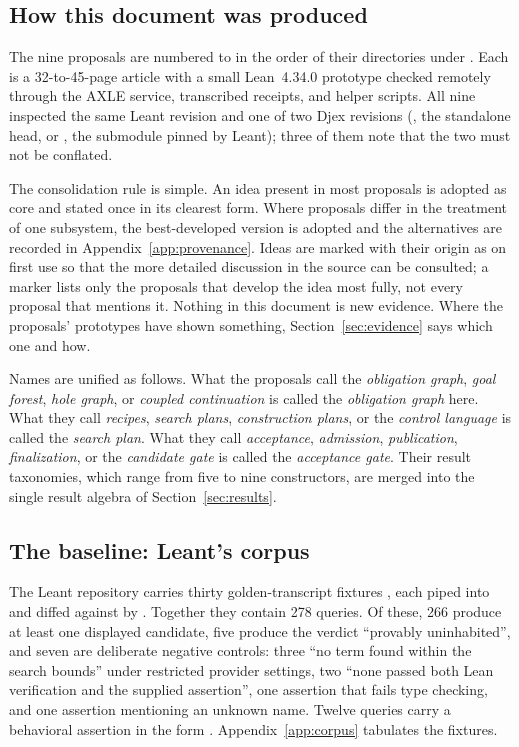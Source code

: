 \subsection{How this document was produced}\label{sec:method}

The nine proposals are numbered  to  in the order of their directories under . Each is a 32-to-45-page article with a small Lean~4.34.0 prototype checked remotely through the AXLE service, transcribed receipts, and helper scripts. All nine inspected the same Leant revision  and one of two Djex revisions (, the standalone head, or , the submodule pinned by Leant); three of them note that the two must not be conflated.

The consolidation rule is simple. An idea present in most proposals is adopted as core and stated once in its clearest form. Where proposals differ in the treatment of one subsystem, the best-developed version is adopted and the alternatives are recorded in Appendix~\ref{app:provenance}. Ideas are marked with their origin as  on first use so that the more detailed discussion in the source can be consulted; a marker lists only the proposals that develop the idea most fully, not every proposal that mentions it. Nothing in this document is new evidence. Where the proposals' prototypes have shown something, Section~\ref{sec:evidence} says which one and how.

Names are unified as follows. What the proposals call the \emph{obligation graph}, \emph{goal forest}, \emph{hole graph}, or \emph{coupled continuation} is called the \emph{obligation graph} here. What they call \emph{recipes}, \emph{search plans}, \emph{construction plans}, or the \emph{control language} is called the \emph{search plan}. What they call \emph{acceptance}, \emph{admission}, \emph{publication}, \emph{finalization}, or the \emph{candidate gate} is called the \emph{acceptance gate}. Their result taxonomies, which range from five to nine constructors, are merged into the single result algebra of Section~\ref{sec:results}.

\subsection{The baseline: Leant's  corpus}\label{sec:baseline}

The Leant repository carries thirty golden-transcript fixtures , each piped into  and diffed against  by . Together they contain 278  queries. Of these, 266 produce at least one displayed candidate, five produce the verdict ``provably uninhabited'', and seven are deliberate negative controls: three ``no term found within the search bounds'' under restricted provider settings, two ``none passed both Lean verification and the supplied assertion'', one assertion that fails type checking, and one assertion mentioning an unknown name. Twelve queries carry a behavioral assertion in the form . Appendix~\ref{app:corpus} tabulates the fixtures.

